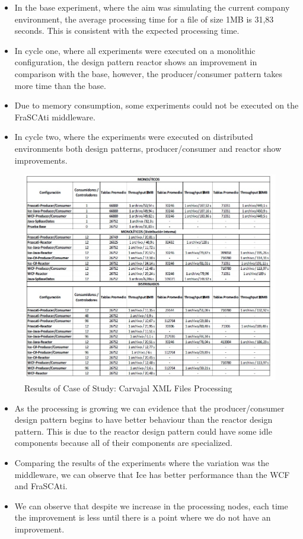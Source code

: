 \begin{itemize}
	\item In the base experiment, where the aim was simulating the current company environment, the average processing time for a file of size 1MB is 31,83 seconds. This is consistent with the expected processing time.
	\item In cycle one, where all experiments were executed on a monolithic configuration, the design pattern reactor shows an improvement in comparison with the base, however, the producer/consumer pattern takes more time than the base.
	\item Due to memory consumption, some experiments could not be executed on the FraSCAti middleware.
	\item In cycle two, where the experiments were executed on distributed environments both design patterns, producer/consumer and reactor show improvements.

\end{itemize}

\begin{figure}[H]
	\centering
	\includegraphics[trim=0.5cm 0cm -5cm 0cm, scale=0.8]{fig/carvajalResults.png}
	\caption{Results of Case of Study: Carvajal XML Files Processing }
	\label{fig:carvajalResults}
\end{figure}

\begin{itemize}
	\item As the processing is growing we can evidence that the producer/consumer design pattern begins to have better behaviour than the reactor design pattern. This is due to the reactor design pattern could have some idle components because all of their components are specialized.
	\item Comparing the results of the experiments where the variation was the middleware, we can observe that Ice has better performance than the WCF and FraSCAti.
	\item We can observe that despite we increase in the processing nodes, each time the improvement is less until there is a point where we do not have an improvement.
\end{itemize}



